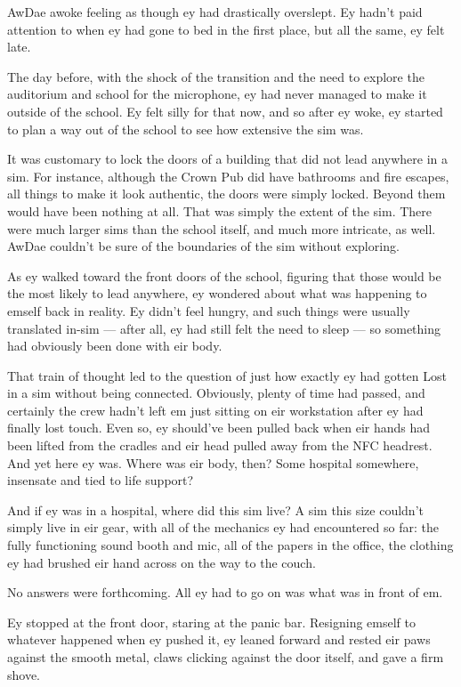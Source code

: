 AwDae awoke feeling as though ey had drastically overslept. Ey hadn't paid attention to when ey had gone to bed in the first place, but all the same, ey felt late.

The day before, with the shock of the transition and the need to explore the auditorium and school for the microphone, ey had never managed to make it outside of the school. Ey felt silly for that now, and so after ey woke, ey started to plan a way out of the school to see how extensive the sim was.

It was customary to lock the doors of a building that did not lead anywhere in a sim. For instance, although the Crown Pub did have bathrooms and fire escapes, all things to make it look authentic, the doors were simply locked. Beyond them would have been nothing at all. That was simply the extent of the sim. There were much larger sims than the school itself, and much more intricate, as well. AwDae couldn't be sure of the boundaries of the sim without exploring.

As ey walked toward the front doors of the school, figuring that those would be the most likely to lead anywhere, ey wondered about what was happening to emself back in reality. Ey didn't feel hungry, and such things were usually translated in-sim --- after all, ey had still felt the need to sleep --- so something had obviously been done with eir body.

That train of thought led to the question of just how exactly ey had gotten Lost in a sim without being connected. Obviously, plenty of time had passed, and certainly the crew hadn't left em just sitting on eir workstation after ey had finally lost touch. Even so, ey should've been pulled back when eir hands had been lifted from the cradles and eir head pulled away from the NFC headrest. And yet here ey was. Where was eir body, then? Some hospital somewhere, insensate and tied to life support?

And if ey was in a hospital, where did this sim live? A sim this size couldn't simply live in eir gear, with all of the mechanics ey had encountered so far: the fully functioning sound booth and mic, all of the papers in the office, the clothing ey had brushed eir hand across on the way to the couch.

No answers were forthcoming. All ey had to go on was what was in front of em.

Ey stopped at the front door, staring at the panic bar. Resigning emself to whatever happened when ey pushed it, ey leaned forward and rested eir paws against the smooth metal, claws clicking against the door itself, and gave a firm shove.

